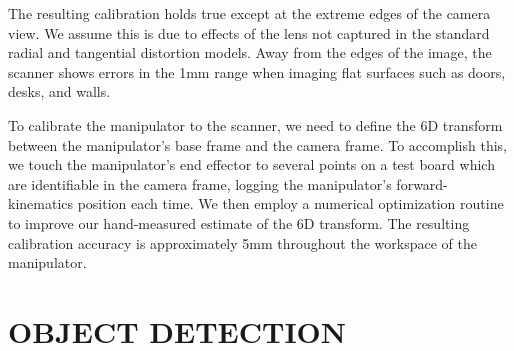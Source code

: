 \documentclass[letterpaper, 10 pt, conference]{ieeeconf}  %
\begin{document}
The resulting calibration holds true except at the extreme edges of the camera
view. We assume this is due to effects of the lens not captured in the standard
radial and tangential distortion models. Away from the edges of the image, 
the scanner shows errors in the 1mm range when imaging flat surfaces such as
doors, desks, and walls.

To calibrate the manipulator to the scanner, we need to define the 6D transform
between the manipulator's base frame and the camera frame. To accomplish this,
we touch the manipulator's end effector to several points on a test board which
are identifiable in the camera frame, logging the manipulator's
forward-kinematics position each time.  We then employ a numerical optimization
routine to improve our hand-measured estimate of the 6D transform.  The
resulting calibration accuracy is approximately 5mm throughout the workspace of
the manipulator.


\section{OBJECT DETECTION}
\end{document}
